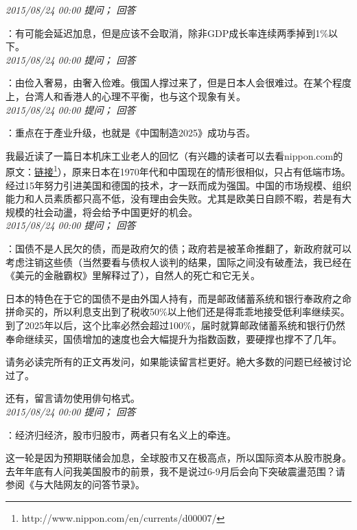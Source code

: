 \documentclass[twocolumn]{ctexart}
\begin{document}
\textit{\hfill\noindent\small 2015/08/24 00:00 提问； 回答}

：有可能会延迟加息，但是应该不会取消，除非GDP成长率连续两季掉到1\%以下。\\

\textit{\hfill\noindent\small 2015/08/24 00:00 提问； 回答}

：由俭入奢易，由奢入俭难。俄国人撑过来了，但是日本人会很难过。在某个程度上，台湾人和香港人的心理不平衡，也与这个现象有关。\\

\textit{\hfill\noindent\small 2015/08/24 00:00 提问； 回答}

：重点在于產业升级，也就是《中国制造2025》成功与否。

我最近读了一篇日本机床工业老人的回忆（有兴趣的读者可以去看nippon.com的原文：\href{http://www.nippon.com/en/currents/d00007/}{链接\footnote{\url{http://www.nippon.com/en/currents/d00007/}}}），原来日本在1970年代和中国现在的情形很相似，只占有低端市场。经过15年努力引进美国和德国的技术，才一跃而成为强国。中国的市场规模、组织能力和人员素质都只高不低，没有理由会失败。尤其是欧美日自顾不暇，若是有大规模的社会动盪，将会给予中国更好的机会。\\

\textit{\hfill\noindent\small 2015/08/24 00:00 提问； 回答}

：国债不是人民欠的债，而是政府欠的债；政府若是被革命推翻了，新政府就可以考虑注销这些债（当然要看与债权人谈判的结果，国际之间没有破產法，我已经在《美元的金融霸权》里解释过了），自然人的死亡和它无关。

日本的特色在于它的国债不是由外国人持有，而是邮政储蓄系统和银行奉政府之命拼命买的，所以利息支出到了税收50\%以上他们还是得乖乖地接受低利率继续买。到了2025年以后，这个比率必然会超过100\%，届时就算邮政储蓄系统和银行仍然奉命继续买，国债增加的速度也会大幅提升为指数函数，要硬撑也撑不了几年。

请务必读完所有的正文再发问，如果能读留言栏更好。絶大多数的问题已经被讨论过了。

还有，留言请勿使用俳句格式。\\

\textit{\hfill\noindent\small 2015/08/24 00:00 提问； 回答}

：经济归经济，股市归股市，两者只有名义上的牵连。

这一轮是因为预期联储会加息，全球股市又在极高点，所以国际资本从股市脱身。去年年底有人问我美国股市的前景，我不是说过6-9月后会向下突破震盪范围？请参阅《与大陆网友的问答节录》。
\end{document}
